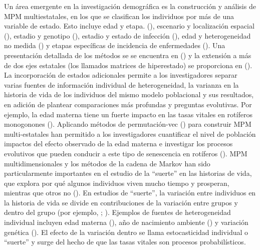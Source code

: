 \documentclass[
]{book}
\theoremstyle{definition}
\theoremstyle{definition}
\theoremstyle{definition}
\theoremstyle{definition}
\theoremstyle{remark}
\begin{document}
Un área emergente en la investigación demográfica es la construcción y análisis de MPM multiestatales, en los que se clasifican los individuos por más de una variable de estado. Esto incluye edad y etapa. (\citet{caswell2013age}), escenario y localización espacial (\citet{hunter2005selective}), estadio y genotipo (\citet{de2019selection}), estadio y estado de infección (\citet{klepac2011stage}), edad y heterogeneidad no medida (\citet{hartemink2017stochasticity}) y etapas específicas de incidencia de enfermedades (\citet{caswell2021healthy}). Una presentación detallada de los métodos se se encuentra en (\citet{caswell2018age}) y la extensión a más de dos ejes estatales (los llamados matrices de hiperestado) se proporciona en (\citet{roth2016hyperstate}). La incorporación de estados adicionales permite a los investigadores separar varias fuentes de información individual de heterogeneidad, la varianza en la historia de vida de los individuos del mismo modelo poblacional y sus resultados, en adición de plantear comparaciones más profundas y preguntas evolutivas. Por ejemplo, la edad materna tiene un fuerte impacto en las tasas vitales en rotíferos monogonones (\citet{bock2019maternal}). Aplicando métodos de permutación-vec (\citet{caswell2012matrix}) para construir MPM multi-estatales han permitido a los investigadores cuantificar el nivel de población impactos del efecto observado de la edad materna e investigar los procesos evolutivos que pueden conducir a este tipo de senescencia en rotíferos (\citet{hernandez2020demographic}). MPM multidimensionales y los métodos de la cadena de Markov han sido particularmente importantes en el estudio de la ``suerte'' en las historias de vida, que explora por qué algunos individuos viven mucho tiempo y prosperan, mientras que otros no (\citet{snyder2022snared}). En estudios de ``suerte'', la variación entre individuos en la historia de vida se divide en contribuciones de la variación entre grupos y dentro del grupo (por ejemplo, \citet{snyder2018pluck}; \citet{van2017lifetime}). Ejemplos de fuentes de heterogeneidad individual incluyen edad materna (\citet{van2022contributions}), año de nacimiento ambiente (\citet{snyder2022snared}) y variación genética (\citet{steiner2021quantifying}). El efecto de la variación dentro se llama estocasticidad individual o ``suerte'' y surge del hecho de que las tasas vitales son procesos probabilísticos.
\end{document}
